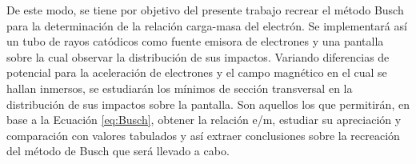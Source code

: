 De este modo, se tiene por objetivo del presente trabajo recrear el método Busch para la determinación de la relación carga-masa del electrón. Se implementará así un tubo de rayos catódicos como fuente emisora de electrones y una pantalla sobre la cual observar la distribución de sus impactos. Variando diferencias de potencial para la aceleración de electrones y el campo magnético en el cual se hallan inmersos, se estudiarán los mínimos de sección transversal en la distribución de sus impactos sobre la pantalla. Son aquellos los que permitirán, en base a la Ecuación \ref{eq:Busch}, obtener la relación e/m, estudiar su apreciación y comparación con valores tabulados y así extraer conclusiones sobre la recreación del método de Busch que será llevado a cabo.
